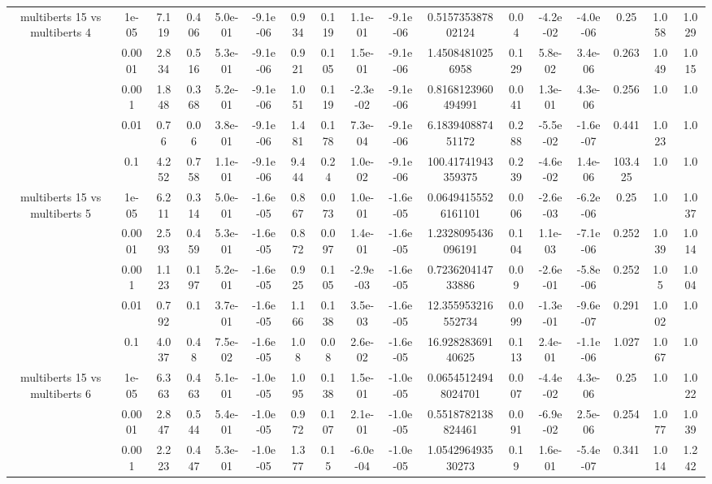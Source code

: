 \begin{tabular}{|c|c|c|c|c|c|c|c|c|c|c|c|c|c|c|c|c|}
\hline
\multirow{5}{*}{multiberts 15 vs multiberts 4} & 1e-05 & 7.119 & 0.406 & 5.0e-01 & -9.1e-06 & 0.934 & 0.119 & 1.1e-01 & -9.1e-06 & 0.515735387802124 & 0.04 & -4.2e-02 & -4.0e-06 & 0.25 & 1.058 & 1.029 \\
 & 0.0001 & 2.834 & 0.516 & 5.3e-01 & -9.1e-06 & 0.921 & 0.105 & 1.5e-01 & -9.1e-06 & 1.45084810256958 & 0.129 & 5.8e-02 & 3.4e-06 & 0.263 & 1.049 & 1.015 \\
 & 0.001 & 1.848 & 0.368 & 5.2e-01 & -9.1e-06 & 1.051 & 0.119 & -2.3e-02 & -9.1e-06 & 0.8168123960494991 & 0.041 & 1.3e-01 & 4.3e-06 & 0.256 & 1.0 & 1.0 \\
 & 0.01 & 0.76 & 0.06 & 3.8e-01 & -9.1e-06 & 1.481 & 0.178 & 7.3e-04 & -9.1e-06 & 6.183940887451172 & 0.288 & -5.5e-02 & -1.6e-07 & 0.441 & 1.023 & 1.0 \\
 & 0.1 & 4.252 & 0.758 & 1.1e-01 & -9.1e-06 & 9.444 & 0.24 & 1.0e-02 & -9.1e-06 & 100.41741943359375 & 0.239 & -4.6e-02 & 1.4e-06 & 103.425 & 1.0 & 1.0 \\
\hline
\multirow{5}{*}{multiberts 15 vs multiberts 5} & 1e-05 & 6.211 & 0.314 & 5.0e-01 & -1.6e-05 & 0.867 & 0.073 & 1.0e-01 & -1.6e-05 & 0.06494155526161101 & 0.006 & -2.6e-03 & -6.2e-06 & 0.25 & 1.0 & 1.037 \\
 & 0.0001 & 2.593 & 0.459 & 5.3e-01 & -1.6e-05 & 0.872 & 0.097 & 1.4e-01 & -1.6e-05 & 1.2328095436096191 & 0.104 & 1.1e-03 & -7.1e-06 & 0.252 & 1.039 & 1.014 \\
 & 0.001 & 1.123 & 0.197 & 5.2e-01 & -1.6e-05 & 0.925 & 0.105 & -2.9e-03 & -1.6e-05 & 0.723620414733886 & 0.09 & -2.6e-01 & -5.8e-06 & 0.252 & 1.05 & 1.004 \\
 & 0.01 & 0.792 & 0.1 & 3.7e-01 & -1.6e-05 & 1.166 & 0.138 & 3.5e-03 & -1.6e-05 & 12.355953216552734 & 0.099 & -1.3e-01 & -9.6e-07 & 0.291 & 1.002 & 1.0 \\
 & 0.1 & 4.037 & 0.48 & 7.5e-02 & -1.6e-05 & 1.08 & 0.08 & 2.6e-02 & -1.6e-05 & 16.92828369140625 & 0.113 & 2.4e-01 & -1.1e-06 & 1.027 & 1.067 & 1.0 \\
\hline
\multirow{5}{*}{multiberts 15 vs multiberts 6} & 1e-05 & 6.363 & 0.463 & 5.1e-01 & -1.0e-05 & 1.095 & 0.138 & 1.5e-01 & -1.0e-05 & 0.06545124948024701 & 0.007 & -4.4e-02 & 4.3e-06 & 0.25 & 1.0 & 1.022 \\
 & 0.0001 & 2.847 & 0.544 & 5.4e-01 & -1.0e-05 & 0.972 & 0.107 & 2.1e-01 & -1.0e-05 & 0.5518782138824461 & 0.091 & -6.9e-02 & 2.5e-06 & 0.254 & 1.077 & 1.039 \\
 & 0.001 & 2.223 & 0.447 & 5.3e-01 & -1.0e-05 & 1.377 & 0.15 & -6.0e-04 & -1.0e-05 & 1.054296493530273 & 0.19 & 1.6e-01 & -5.4e-07 & 0.341 & 1.014 & 1.242 \\

\end{tabular}
